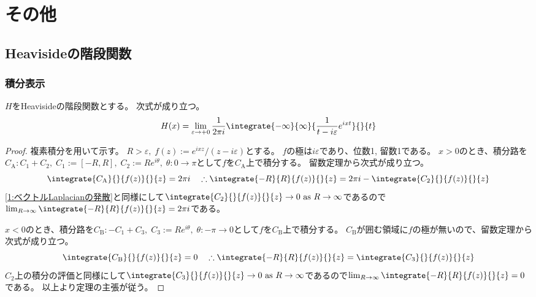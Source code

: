 \part{その他}
    \chapter{Heavisideの階段関数}
        \section{積分表示}
            \begin{shadebox}
                $H$をHeavisideの階段関数とする。
                次式が成り立つ。
                \[ H(x) = \lim_{\varepsilon\to +0}\frac{1}{2\pi i}\integrate{-\infty}{\infty}{\frac{1}{t-i\varepsilon}e^{ixt}}{}{t} \]
            \end{shadebox}
            \begin{proof}
                \quad\par
                複素積分を用いて示す。
                $R>\varepsilon,\;f(z) := e^{ixz}/(z-i\varepsilon)$とする。
                $f$の極は$i\varepsilon$であり、位数1, 留数1である。
                $x>0$のとき、積分路を$C_\mathrm{A}: C_1 + C_2,\; C_1 := [-R,R],\; C_2 := Re^{i\theta},\;\theta:0\to\pi$として$f$を$C_\mathrm{A}$上で積分する。
                留数定理から次式が成り立つ。
                \[ \integrate{C_\mathrm{A}}{}{f(z)}{}{z} = 2\pi i \quad \therefore \integrate{-R}{R}{f(z)}{}{z} = 2\pi i - \integrate{C_2}{}{f(z)}{}{z} \]
                \cite{数学備忘録}\ref{1:ベクトルLaplacianの発散}と同様にして$\integrate{C_2}{}{f(z)}{}{z} \to 0 \text{ as }R\to\infty$であるので$\lim_{R\to\infty}\integrate{-R}{R}{f(z)}{}{z} = 2\pi i$である。
                \par
                $x<0$のとき、積分路を$C_\mathrm{B}: -C_1 + C_3,\; C_3 := Re^{i\theta},\;\theta:-\pi\to 0$として$f$を$C_\mathrm{B}$上で積分する。
                $C_\mathrm{B}$が囲む領域に$f$の極が無いので、留数定理から次式が成り立つ。
                \[ \integrate{C_\mathrm{B}}{}{f(z)}{}{z} = 0 \quad \therefore \integrate{-R}{R}{f(z)}{}{z} = \integrate{C_3}{}{f(z)}{}{z} \]
                $C_\mathrm{2}$上の積分の評価と同様にして$\integrate{C_3}{}{f(z)}{}{z} \to 0 \text{ as }R\to\infty$であるので$\lim_{R\to\infty}\integrate{-R}{R}{f(z)}{}{z} = 0$である。
                以上より定理の主張が従う。
            \end{proof}